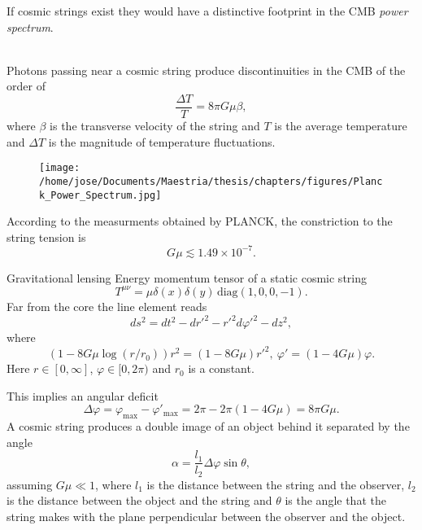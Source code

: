 \documentclass[14pt]{beamer}
\begin{document}
\begin{frame}
	If cosmic strings exist they would have a distinctive footprint in the CMB \textit{power spectrum}.\\~\
	
Photons passing near a cosmic string produce discontinuities in the CMB of the order of 
\begin{equation*}
	\frac{\Delta T}{T} = 8\pi G \mu \beta,
\end{equation*}	
	where $\beta$ is the transverse velocity of the string and $T$ is the average temperature and $\Delta T$ is the magnitude of temperature fluctuations.
\end{frame}

\begin{frame}
\begin{figure}
	\centering
	\texttt{[image: /home/jose/Documents/Maestria/thesis/chapters/figures/Planck\_Power\_Spectrum.jpg]}
\end{figure}
\end{frame}


\begin{frame}
According to the measurments obtained by PLANCK, the constriction to the string tension is
\begin{equation*}
G\mu \lesssim 1.49\times 10^{-7}.
\end{equation*}
\end{frame}


\begin{frame}{Gravitational lensing}
Energy momentum tensor of a static cosmic string
\begin{equation*}
	T^{\mu\nu} = \mu\delta(x)\delta(y)\,\text{diag}(1,0,0,-1).
	\label{eq:energytensor}
\end{equation*}
Far from the core the line element reads
\begin{equation*}
	ds^2 = dt^2-dr'^2-r'^2d\varphi'^2-dz^2,
	\label{eq:metric}
\end{equation*}
where
\begin{equation*}
(1-8G\mu\log(r/r_0))r^2 = (1-8G\mu)r'^2,  \ \varphi' = (1-4G\mu)\varphi.
\end{equation*}
Here $r\in [0,\infty] $, $\varphi\in[0,2\pi)$ and $r_0$ is a constant.
\end{frame}


\begin{frame}
This implies an angular deficit 
\begin{equation*}
\Delta \varphi = \varphi_{\text{max}} - \varphi'_{\text{max}} = 2\pi -2\pi(1-4G\mu) = 8\pi G\mu.
\end{equation*}
A cosmic string produces a double image of an object behind it separated by the angle
\begin{equation*}
	\alpha = \frac{l_1}{l_2}\Delta\varphi\sin\theta,
\end{equation*}
assuming $G\mu\ll 1$, where $l_1$ is the distance between the string and the observer, $l_2$ is the distance between the object and the string and $\theta$ is the angle that the string makes with the plane perpendicular between the observer and the object.
\end{frame}
\end{document}
